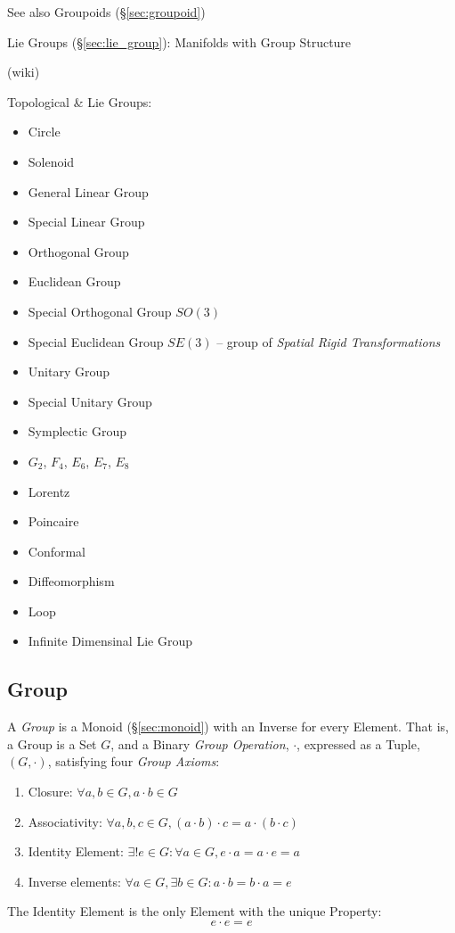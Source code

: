 \fist See also Groupoids (\S\ref{sec:groupoid})

\fist Lie Groups (\S\ref{sec:lie_group}): Manifolds with Group Structure

(wiki)

Topological & Lie Groups:
\begin{itemize}
  \item Circle
  \item Solenoid
  \item General Linear Group
  \item Special Linear Group
  \item Orthogonal Group
  \item Euclidean Group
  \item Special Orthogonal Group $SO(3)$
  \item Special Euclidean Group $SE(3)$ -- group of \emph{Spatial Rigid
    Transformations}
  \item Unitary Group
  \item Special Unitary Group
  \item Symplectic Group
  \item $G_2$, $F_4$, $E_6$, $E_7$, $E_8$
  \item Lorentz
  \item Poincaire
  \item Conformal
  \item Diffeomorphism
  \item Loop
  \item Infinite Dimensinal Lie Group
\end{itemize}




\subsection{Group}\label{sec:group}

A \emph{Group} is a Monoid (\S\ref{sec:monoid}) with an Inverse for
every Element. That is, a Group is a Set $G$, and a Binary \emph{Group
  Operation}, $\cdot$, expressed as a Tuple, $(G,\cdot)$, satisfying
four \emph{Group Axioms}:
\begin{enumerate}
    \item Closure: $\forall a,b \in G, a \cdot b \in G$
    \item Associativity: $\forall a,b,c \in G, (a \cdot b) \cdot c = a
      \cdot (b \cdot c)$
    \item Identity Element: $\exists! e \in G : \forall a \in G,
      e \cdot a = a \cdot e = a$
    \item Inverse elements: $\forall a \in G, \exists b \in G :
      a \cdot b = b \cdot a = e$
\end{enumerate}
The Identity Element is the only Element with the unique Property:
\[
    e \cdot e = e
\]

